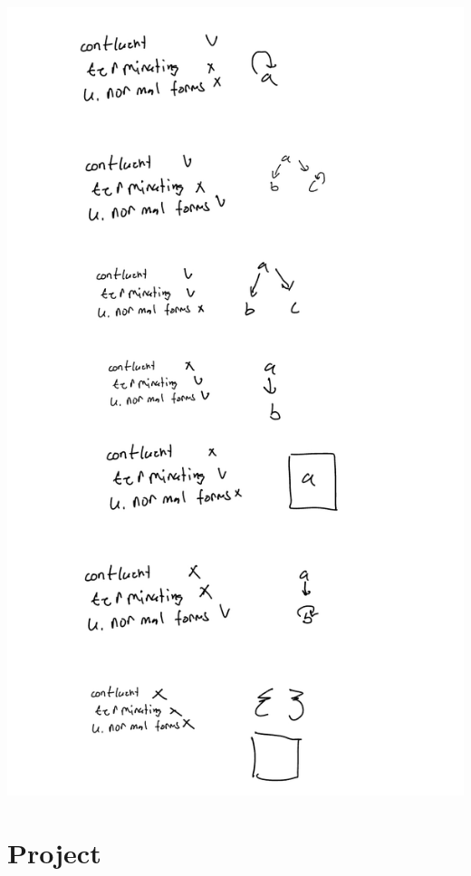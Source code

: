 \documentclass{article}
\theoremstyle{theorem}
\theoremstyle{definition}
\theoremstyle{remark}
\begin{document}
\begin{enumerate}
\includegraphics[scale=0.2]{hw6.jpg}


\section{Project}\label{Project}

\end{enumerate}
\end{document}
